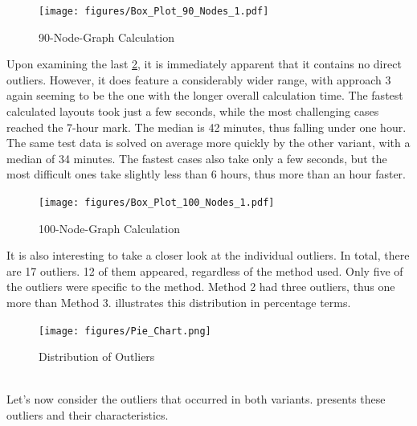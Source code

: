 \documentclass[bachelor, english]{algothesis}
\begin{document}
\begin{figure}[ht]
  \centering
  \begin{minipage}{0.5\textwidth}
          \texttt{[image: figures/Box\_Plot\_90\_Nodes\_1.pdf]} 
  \caption{90-Node-Graph Calculation}
  \label{fig:Calc_90_Nodes}
  \end{minipage}%
  \begin{minipage}{0.45\textwidth}

  \end{minipage}
\end{figure}
\noindent
Upon examining the last \cref{fig:Calc_100_Nodes}, it is immediately apparent that it contains no direct outliers. However, it does feature a considerably wider range, with approach 3 again seeming to be the one with the longer overall calculation time. The fastest calculated layouts took just a few seconds, while the most challenging cases reached the 7-hour mark. The median is 42 minutes, thus falling under one hour. The same test data is solved on average more quickly by the other variant, with a median of 34 minutes. The fastest cases also take only a few seconds, but the most difficult ones take slightly less than 6 hours, thus more than an hour faster.
\noindent
\begin{figure}[ht]
  \centering
  \begin{minipage}{0.5\textwidth}
          \texttt{[image: figures/Box\_Plot\_100\_Nodes\_1.pdf]} 
  \caption{100-Node-Graph Calculation}
  \label{fig:Calc_100_Nodes}
  \end{minipage}
  \begin{minipage}{0.47\textwidth}
  
  \end{minipage}
\end{figure}
\newpage
\noindent
It is also interesting to take a closer look at the individual outliers. In total, there are 17 outliers. 12 of them appeared, regardless of the method used. Only five of the outliers were specific to the method. Method 2 had three outliers, thus one more than Method 3.  illustrates this distribution in percentage terms.
\begin{figure}[ht]
  \centering
    \texttt{[image: figures/Pie\_Chart.png]} 
  \caption{Distribution of Outliers}
  \label{fig:Outliers}
\end{figure}
\noindent
\\
Let's now consider the outliers that occurred in both variants.  presents these outliers and their characteristics.
\newline
\end{document}
